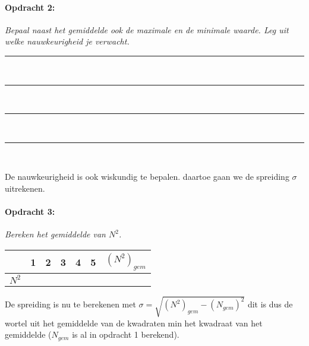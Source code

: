 \bigskip{}

\begin{minipage}[t]{1\columnwidth}%

\paragraph{Opdracht 2:}

\textit{Bepaal naast het gemiddelde ook de maximale en de minimale
waarde. Leg uit welke nauwkeurigheid je verwacht.}

\begin{center}
    \rule{\textwidth}{0.3mm}\\
    \rule{\textwidth}{0.3mm}\\
    \rule{\textwidth}{0.3mm}\\
    \rule{\textwidth}{0.3mm}\\
\end{center}
\end{minipage}

\bigskip{}


De nauwkeurigheid is ook wiskundig te bepalen. daartoe gaan we de spreiding $\sigma$ uitrekenen.

\begin{minipage}[t]{1\columnwidth}%

\paragraph{Opdracht 3:}

\textit{Bereken het gemiddelde van $N^{2}$.}

\bigskip{}


\begin{tabular}{|x{.11\textwidth}|x{.11\textwidth}|x{.11\textwidth}
                |x{.11\textwidth}|x{.11\textwidth}|x{.11\textwidth}
                |x{.11\textwidth}|}
     & 1 & 2 & 3 & 4 & 5 & $\left(N^{2}\right)_{gem}$\\
    \hline 
    $N^{2}$ &  &  &  &  &  & \\
    \hline 
\end{tabular}

\bigskip{}

De spreiding is nu te berekenen met
$\sigma=\sqrt{\left(N^{2}\right)_{gem}-\left(N_{gem}\right)^{2}}$ dit is
dus de wortel uit het gemiddelde van de kwadraten min het kwadraat van
het gemiddelde ($N_{gem}$ is al in opdracht 1 berekend).

\end{minipage}

